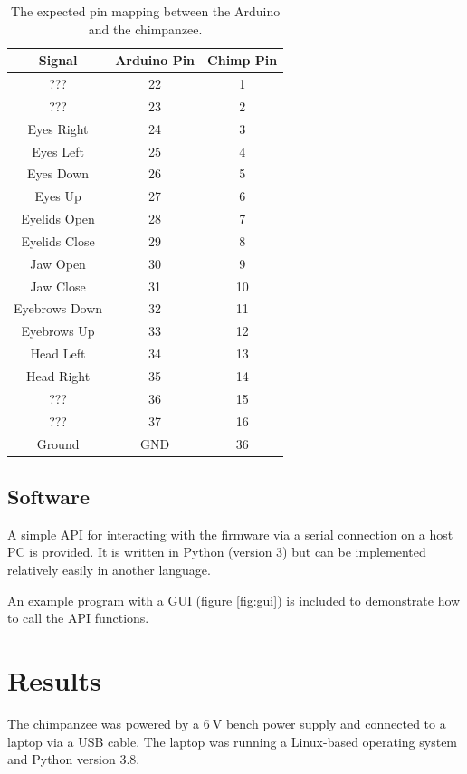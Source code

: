 \documentclass[11pt]{article} %
\begin{document}
\begin{table}[h]
	\caption{The expected pin mapping between the Arduino and the chimpanzee.}
	\centering
	\begin{tabular}{ |c|c|c| }
		\hline
		\textbf{Signal} & \textbf{Arduino Pin} & \textbf{Chimp Pin} \\
		\hline
		??? & 22 & 1 \\
		??? & 23 & 2 \\
		Eyes Right & 24 & 3 \\
		Eyes Left & 25 & 4 \\
		Eyes Down & 26 & 5 \\
		Eyes Up & 27 & 6\\
		Eyelids Open & 28 & 7 \\
		Eyelids Close & 29 & 8 \\
		Jaw Open & 30 & 9 \\
		Jaw Close & 31 & 10 \\
		Eyebrows Down & 32 & 11 \\
		Eyebrows Up & 33 & 12 \\
		Head Left & 34 & 13 \\
		Head Right & 35 & 14\\
		??? & 36 & 15 \\
		??? & 37 & 16 \\
		Ground & GND & 36 \\
		\hline
	\end{tabular}
	\label{tab:pinmap}
\end{table}


\subsection{Software}

A simple API for interacting with the firmware via a serial connection on a host PC is provided.
It is written in Python (version 3) but can be implemented relatively easily in another language.

An example program with a GUI (figure \ref{fig:gui}) is included to demonstrate how to call the API functions.


\section{Results}

The chimpanzee was powered by a $\SI{6}{\volt}$ bench power supply and connected to a laptop via a USB cable.
The laptop was running a Linux-based operating system and Python version 3.8.
\end{document}
